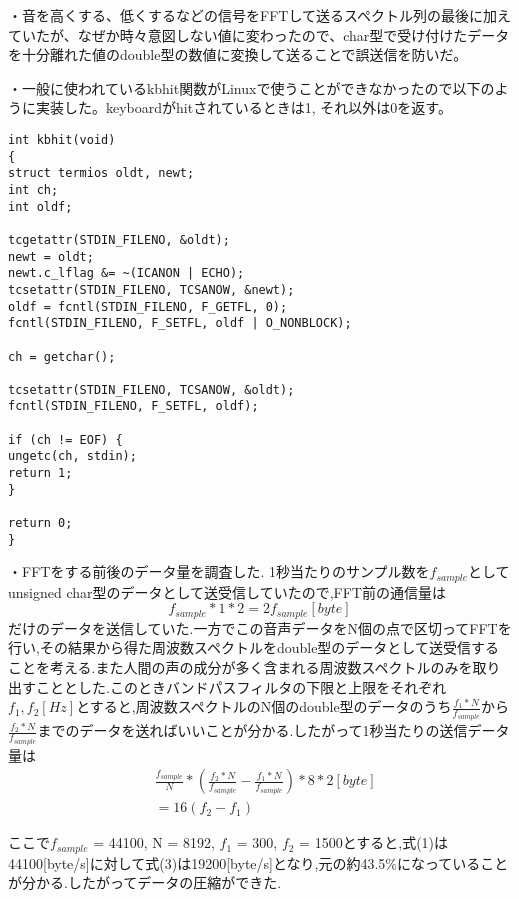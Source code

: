 \documentclass[dvipdfmx]{jsarticle}
\begin{document}
・音を高くする、低くするなどの信号をFFTして送るスペクトル列の最後に加えていたが、なぜか時々意図しない値に変わったので、char型で受け付けたデータを十分離れた値のdouble型の数値に変換して送ることで誤送信を防いだ。

・一般に使われているkbhit関数がLinuxで使うことができなかったので以下のように実装した。keyboardがhitされているときは1, それ以外は0を返す。

\begin{lstlisting}[frame = single, basicstyle = \ttfamily\footnotesize]
int kbhit(void)
{
struct termios oldt, newt;
int ch;
int oldf;

tcgetattr(STDIN_FILENO, &oldt);
newt = oldt;
newt.c_lflag &= ~(ICANON | ECHO);
tcsetattr(STDIN_FILENO, TCSANOW, &newt);
oldf = fcntl(STDIN_FILENO, F_GETFL, 0);
fcntl(STDIN_FILENO, F_SETFL, oldf | O_NONBLOCK);

ch = getchar();

tcsetattr(STDIN_FILENO, TCSANOW, &oldt);
fcntl(STDIN_FILENO, F_SETFL, oldf);

if (ch != EOF) {
ungetc(ch, stdin);
return 1;
}

return 0;
}
\end{lstlisting}



・FFTをする前後のデータ量を調査した.
1秒当たりのサンプル数を$f_{sample}$としてunsigned char型のデータとして送受信していたので,FFT前の通信量は
\begin{equation}
f_{sample} * 1 * 2= 2f_{sample}[byte] 
\end{equation}
だけのデータを送信していた.一方でこの音声データをN個の点で区切ってFFTを行い,その結果から得た周波数スペクトルをdouble型のデータとして送受信することを考える.また人間の声の成分が多く含まれる周波数スペクトルのみを取り出すこととした.このときバンドパスフィルタの下限と上限をそれぞれ$f_1,f_2[Hz]$とすると,周波数スペクトルのN個のdouble型のデータのうち$\frac{f_1*N}{f_{sample}}$から$\frac{f_2*N}{f_{sample}}$までのデータを送ればいいことが分かる.したがって1秒当たりの送信データ量は
\begin{align}
&\frac{f_{sample}}{N}*(\frac{f_2*N}{f_{sample}}-\frac{f_1*N}{f_{sample}})*8*2[byte]\\
&= 16(f_{2}-f_{1})
\end{align}

ここで$f_{sample}$ = 44100, N = 8192, $f_1$ = 300, $f_2$ = 1500とすると,式(1)は44100[byte/s]に対して式(3)は19200[byte/s]となり,元の約43.5\%になっていることが分かる.したがってデータの圧縮ができた.
\end{document}
